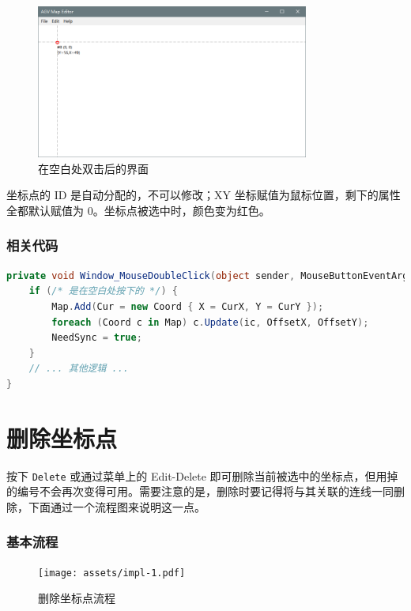 \begin{figure}[H]
  \centering
  \includegraphics[width=0.8\textwidth]{assets/dbclick.png}
  \caption{在空白处双击后的界面}
  \label{fig:dbclick}
\end{figure}

坐标点的 ID 是自动分配的，不可以修改；XY 坐标赋值为鼠标位置，剩下的属性全都默认赋值为 0。坐标点被选中时，颜色变为红色。

\subsubsection{相关代码}

\begin{lstlisting}[language=cs]
private void Window_MouseDoubleClick(object sender, MouseButtonEventArgs e) {
    if (/* 是在空白处按下的 */) {
        Map.Add(Cur = new Coord { X = CurX, Y = CurY });
        foreach (Coord c in Map) c.Update(ic, OffsetX, OffsetY);
        NeedSync = true;
    }
    // ... 其他逻辑 ...
}
\end{lstlisting}

\section{删除坐标点}

按下 \texttt{Delete} 或通过菜单上的 Edit-Delete 即可删除当前被选中的坐标点，但用掉的编号不会再次变得可用。需要注意的是，删除时要记得将与其关联的连线一同删除，下面通过一个流程图来说明这一点。

\subsubsection{基本流程}

\begin{figure}[H]
    \centering
    \texttt{[image: assets/impl-1.pdf]}
    \caption{删除坐标点流程}
    \label{fig:impl-1}
\end{figure}

